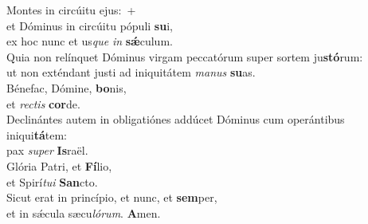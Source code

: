 \evenverse Montes in circúitu ejus:~+\\\evenverse  et Dóminus in circúitu pópuli \textbf{su}i,~\*\\
\evenverse ex hoc nunc et us\textit{que} \textit{in} \textbf{sǽ}culum.\\
\oddverse Quia non relínquet Dóminus virgam peccatórum super sortem ju\textbf{stó}rum:~\*\\
\oddverse ut non exténdant justi ad iniquitátem \textit{ma}\textit{nus} \textbf{su}as.\\
\evenverse Bénefac, Dómine, \textbf{bo}nis,~\*\\
\evenverse et \textit{re}\textit{ctis} \textbf{cor}de.\\
\oddverse Declinántes autem in obligatiónes addúcet Dóminus cum operántibus iniqui\textbf{tá}tem:~\*\\
\oddverse pax \textit{su}\textit{per} \textbf{Is}raël.\\
\evenverse Glória Patri, et \textbf{Fí}lio,~\*\\
\evenverse et Spirí\textit{tu}\textit{i} \textbf{San}cto.\\
\oddverse Sicut erat in princípio, et nunc, et \textbf{sem}per,~\*\\
\oddverse et in sǽcula sæcu\textit{ló}\textit{rum}. \textbf{A}men.\\
